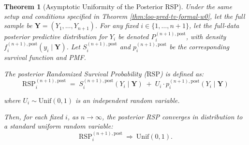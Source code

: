 \documentclass[
  12pt]{article}
\theoremstyle{plain}
\newtheorem{theorem}{Theorem}[section]
\theoremstyle{definition}
\theoremstyle{remark}
\begin{document}
\begin{theorem}[Asymptotic Uniformity of the Posterior RSP]
\label{thm:postrspunif}
Under the same setup and conditions specified in Theorem \ref{thm:loo-pred-tv-formal-w0}, let the full sample be $\mathbf{Y} = (Y_1, \dots, Y_{n+1})$. For any fixed $i \in \{1, \dots, n+1\}$, let the full-data posterior predictive distribution for $Y_i$ be denoted $P_i^{(n+1),\mathrm{post}}$, with density $f_i^{(n+1),\mathrm{post}}(y_i \mid \mathbf{Y})$. Let $S_i^{(n+1),\mathrm{post}}$ and $p_i^{(n+1),\mathrm{post}}$ be the corresponding survival function and PMF.

The posterior Randomized Survival Probability ($\mathrm{RSP}$) is defined as:
\begin{equation}\mathrm{RSP}_i^{(n+1),\mathrm{post}} \;=\; S_i^{(n+1),\mathrm{post}}(Y_i \mid \mathbf{Y})\;+\;U_i \cdot p_i^{(n+1),\mathrm{post}}(Y_i \mid \mathbf{Y})\end{equation}

where $U_i \sim \mathrm{Unif}(0,1)$ is an independent random variable.

Then, for each fixed $i$, as $n\to\infty$, the posterior RSP converges in distribution to a standard uniform random variable:
\begin{equation}\mathrm{RSP}_i^{(n+1),\mathrm{post}} \ \Rightarrow\ \mathrm{Unif}(0,1).\end{equation}

\end{theorem}
\end{document}

